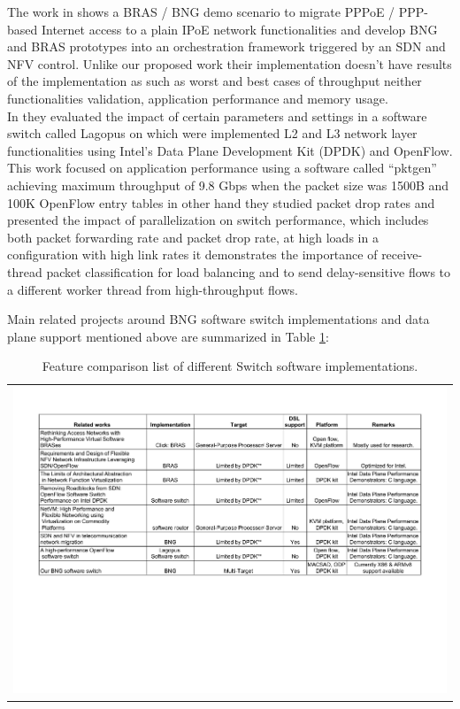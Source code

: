 The work in \cite{Woesner} shows a BRAS / BNG demo scenario to migrate PPPoE / PPP-based Internet access to a plain IPoE network functionalities and develop BNG and BRAS prototypes into an orchestration framework triggered by an SDN and NFV control. Unlike our proposed work their implementation doesn't have results of the implementation as such as worst and best cases of throughput neither functionalities validation, application performance and memory usage.\\

In \cite{Rahimi} they evaluated the impact of certain parameters and settings in a software switch called Lagopus on which were implemented L2 and L3 network layer functionalities using Intel’s Data Plane Development Kit (DPDK) and OpenFlow.\\
This work focused on application performance using a software called “pktgen” achieving  maximum throughput of 9.8 Gbps when the packet size was 1500B and 100K OpenFlow entry tables in other hand they studied packet drop rates and presented the impact of parallelization on switch performance, which includes both packet forwarding rate and packet drop rate, at high loads in a configuration with high link rates it demonstrates the importance of receive-thread packet classification for load balancing and to send delay-sensitive flows to a different worker thread from high-throughput flows.

Main related projects around BNG software switch implementations and data plane support mentioned above are summarized in Table \ref{table:related_w}:

\begin{table}[H]
	\begin{tabular}{ >{\arraybackslash}m{20cm}}
		\includegraphics[width=18cm]{figures/related_w.pdf} 
	\end{tabular}
	\caption{Feature comparison list of different Switch software implementations.}
	\label{table:related_w}
\end{table}
